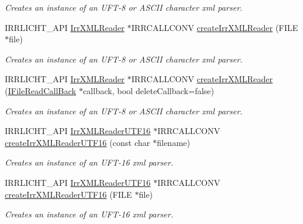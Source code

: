 \begin{DoxyCompactItemize}
\begin{DoxyCompactList}\small\item\em Creates an instance of an U\+F\+T-\/8 or A\+S\+C\+II character xml parser. \end{DoxyCompactList}\item 
I\+R\+R\+L\+I\+C\+H\+T\+\_\+\+A\+PI \hyperlink{namespaceirr_1_1io_a682f8a2c4c57259bfde1ec8fa27a565b}{Irr\+X\+M\+L\+Reader} $\ast$I\+R\+R\+C\+A\+L\+L\+C\+O\+NV \hyperlink{namespaceirr_1_1io_a73fba8aac42e3dd228a0b67a4c79df03}{create\+Irr\+X\+M\+L\+Reader} (F\+I\+LE $\ast$file)
\begin{DoxyCompactList}\small\item\em Creates an instance of an U\+F\+T-\/8 or A\+S\+C\+II character xml parser. \end{DoxyCompactList}\item 
I\+R\+R\+L\+I\+C\+H\+T\+\_\+\+A\+PI \hyperlink{namespaceirr_1_1io_a682f8a2c4c57259bfde1ec8fa27a565b}{Irr\+X\+M\+L\+Reader} $\ast$I\+R\+R\+C\+A\+L\+L\+C\+O\+NV \hyperlink{namespaceirr_1_1io_a1c3b900e1433e2424a7fde667f38d930}{create\+Irr\+X\+M\+L\+Reader} (\hyperlink{classirr_1_1io_1_1IFileReadCallBack}{I\+File\+Read\+Call\+Back} $\ast$callback, bool delete\+Callback=false)
\begin{DoxyCompactList}\small\item\em Creates an instance of an U\+F\+T-\/8 or A\+S\+C\+II character xml parser. \end{DoxyCompactList}\item 
I\+R\+R\+L\+I\+C\+H\+T\+\_\+\+A\+PI \hyperlink{namespaceirr_1_1io_a76b498bd6edceb2e2ef91d75585e6bfd}{Irr\+X\+M\+L\+Reader\+U\+T\+F16} $\ast$I\+R\+R\+C\+A\+L\+L\+C\+O\+NV \hyperlink{namespaceirr_1_1io_a2b7451dc3f1606c80bf46be9ccc955d9}{create\+Irr\+X\+M\+L\+Reader\+U\+T\+F16} (const char $\ast$filename)
\begin{DoxyCompactList}\small\item\em Creates an instance of an U\+F\+T-\/16 xml parser. \end{DoxyCompactList}\item 
I\+R\+R\+L\+I\+C\+H\+T\+\_\+\+A\+PI \hyperlink{namespaceirr_1_1io_a76b498bd6edceb2e2ef91d75585e6bfd}{Irr\+X\+M\+L\+Reader\+U\+T\+F16} $\ast$I\+R\+R\+C\+A\+L\+L\+C\+O\+NV \hyperlink{namespaceirr_1_1io_a12b07ff1ad1f30166bc5d6ddf1c9ee4e}{create\+Irr\+X\+M\+L\+Reader\+U\+T\+F16} (F\+I\+LE $\ast$file)
\begin{DoxyCompactList}\small\item\em Creates an instance of an U\+F\+T-\/16 xml parser. \end{DoxyCompactList}\item 

\end{DoxyCompactItemize}
